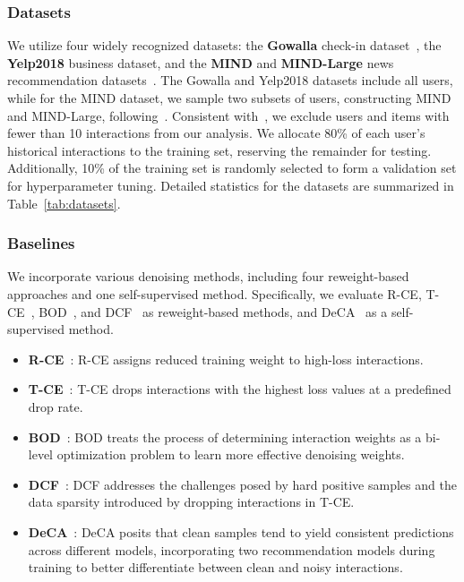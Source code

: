 







\subsubsection{Datasets}
We utilize four widely recognized datasets: the \textbf{Gowalla} check-in dataset~\cite{liang2016modeling}, the \textbf{Yelp2018} business dataset, and the \textbf{MIND} and \textbf{MIND-Large} news recommendation datasets~\cite{wu2020mind}. The Gowalla and Yelp2018 datasets include all users, while for the MIND dataset, we sample two subsets of users, constructing MIND and MIND-Large, following~\cite{zhang2024lorec2}. Consistent with~\cite{zhang2024improving, zhangunderstanding}, we exclude users and items with fewer than 10 interactions from our analysis. We allocate 80\% of each user's historical interactions to the training set, reserving the remainder for testing. Additionally, 10\% of the training set is randomly selected to form a validation set for hyperparameter tuning. Detailed statistics for the datasets are summarized in Table~\ref{tab:datasets}.



\subsubsection{Baselines}
We incorporate various denoising methods, including four reweight-based approaches and one self-supervised method. Specifically, we evaluate R-CE, T-CE~\cite{wang2021denoising}, BOD~\cite{wang2023efficient}, and DCF~\cite{he2024double} as reweight-based methods, and DeCA~\cite{wang2022learning} as a self-supervised method.
\begin{itemize}[leftmargin=*]
   \item \textbf{R-CE}~\cite{wang2021denoising}: R-CE assigns reduced training weight to high-loss interactions.
   \item \textbf{T-CE}~\cite{wang2021denoising}: T-CE drops interactions with the highest loss values at a predefined drop rate.
   \item \textbf{BOD}~\cite{wang2023efficient}: BOD treats the process of determining interaction weights as a bi-level optimization problem to learn more effective denoising weights.
   \item \textbf{DCF}~\cite{he2024double}: DCF addresses the challenges posed by hard positive samples and the data sparsity introduced by dropping interactions in T-CE.
   \item \textbf{DeCA}~\cite{wang2022learning}: DeCA posits that clean samples tend to yield consistent predictions across different models, incorporating two recommendation models during training to better differentiate between clean and noisy interactions.
\end{itemize}

